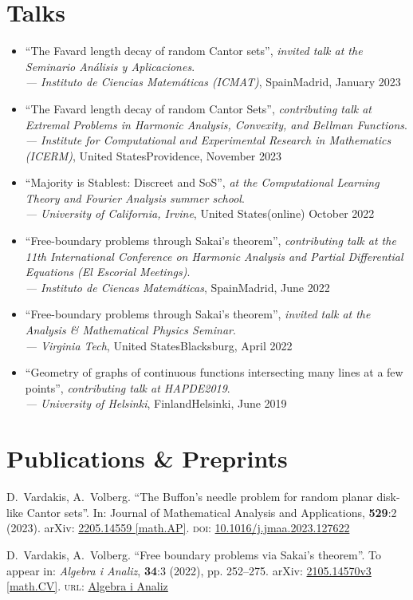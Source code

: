 \documentclass[12pt]{article}
\newcommand{\talk}[5]{\enquote{#1}, \emph{at the #2}.\\ \emph{--- #3}, #4\hfill {#5}}
\newcommand{\contalk}[5]{\enquote{#1}, \emph{contributing talk at #2}.\\ \emph{--- #3}, #4\hfill {#5}}
\newcommand{\invtalk}[5]{\enquote{#1}, \emph{invited talk at the #2}.\\ \emph{--- #3}, #4\hfill {#5}}
\begin{document}
\section*{Talks}

\begin{itemize}
	\item \invtalk{The Favard length decay of random Cantor sets}{Seminario An{\'a}lisis y Aplicaciones}{Instituto de Ciencias Matem{\'a}ticas (ICMAT)}{Spain}{Madrid, January 2023}
	\item \contalk{The Favard length decay of random Cantor Sets}{Extremal Problems in Harmonic Analysis, Convexity, and Bellman Functions}{Institute for Computational and Experimental Research in Mathematics (ICERM)}{United States}{Providence, November 2023}
	\item \talk{Majority is Stablest: Discreet and SoS}{Computational Learning Theory and Fourier Analysis summer school}{University of California, Irvine}{United States}{(online) October 2022}
	\item \contalk{Free-boundary problems through Sakai's theorem}{the 11th International Conference on Harmonic Analysis and Partial Differential Equations (El Escorial Meetings)}{Instituto de Ciencas Matem{\'a}ticas}{Spain}{Madrid, June 2022}
	\item \invtalk{Free-boundary problems through Sakai's theorem}{Analysis \& Mathematical Physics Seminar}{Virginia Tech}{United States}{Blacksburg, April 2022}
	\item \contalk{Geometry of graphs of continuous functions intersecting many lines at a few points}{HAPDE2019}{University of Helsinki}{Finland}{Helsinki, June 2019}
\end{itemize}


\section*{Publications \& Preprints}

D.~Vardakis, A.~Volberg.
\enquote{The Buffon's needle problem for random planar disk-like Cantor sets}.
In: Journal of Mathematical Analysis and Applications, \textbf{529}:2 (2023).
arXiv: \href{https://arxiv.org/abs/2205.14559}{2205.14559 [math.AP]}. \textsc{doi}: \href{https://doi.org/10.1016/j.jmaa.2023.127622}{10.1016/j.jmaa.2023.127622}
\smallskip

D.~Vardakis, A.~Volberg.
\enquote{Free boundary problems via Sakai's theorem}.
To appear in: \emph{Algebra i Analiz}, \textbf{34}:3 (2022), pp. 252--275.
arXiv: \href{https://arxiv.org/abs/2105.14570v3}{2105.14570v3 [math.CV]}.
\textsc{url}: \href{http://www.mathnet.ru/php/archive.phtml?wshow=paper&jrnid=aa&paperid=1818&option_lang=eng}{Algebra i Analiz}
\smallskip
\end{document}
